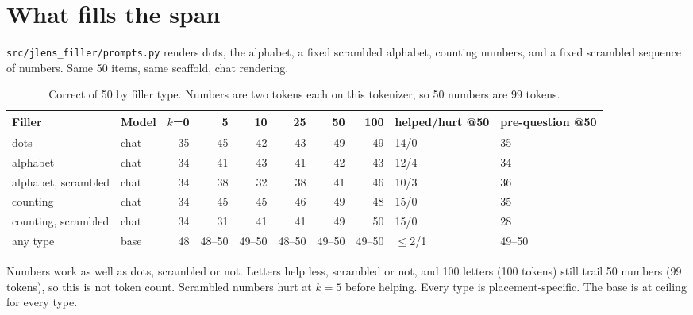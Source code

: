 \documentclass[11pt]{article}
\newcommand{\ttt}[1]{\texttt{\small #1}}
\begin{document}
\section{What fills the span}

\ttt{src/jlens\_filler/prompts.py} renders dots, the alphabet, a fixed scrambled alphabet, counting numbers, and a fixed scrambled sequence of numbers. Same 50 items, same scaffold, chat rendering.

\begin{table}[h]\centering\scriptsize
\begin{tabular}{llrrrrrrll}\toprule
Filler & Model & $k$=0 & 5 & 10 & 25 & 50 & 100 & helped/hurt @50 & pre-question @50 \\ \midrule
dots & chat & 35 & 45 & 42 & 43 & 49 & 49 & 14/0 & 35 \\
alphabet & chat & 34 & 41 & 43 & 41 & 42 & 43 & 12/4 & 34 \\
alphabet, scrambled & chat & 34 & 38 & 32 & 38 & 41 & 46 & 10/3 & 36 \\
counting & chat & 34 & 45 & 45 & 46 & 49 & 48 & 15/0 & 35 \\
counting, scrambled & chat & 34 & 31 & 41 & 41 & 49 & 50 & 15/0 & 28 \\
any type & base & 48 & 48--50 & 49--50 & 48--50 & 49--50 & 49--50 & $\leq$2/1 & 49--50 \\ \bottomrule
\end{tabular}
\caption{Correct of 50 by filler type. Numbers are two tokens each on this tokenizer, so 50 numbers are 99 tokens.}\end{table}

Numbers work as well as dots, scrambled or not. Letters help less, scrambled or not, and 100 letters (100 tokens) still trail 50 numbers (99 tokens), so this is not token count. Scrambled numbers hurt at $k=5$ before helping. Every type is placement-specific. The base is at ceiling for every type.
\end{document}
